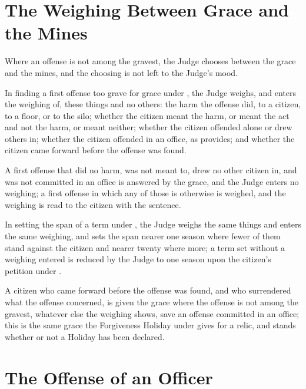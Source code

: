 \section{The Weighing Between Grace and the Mines}
\label{sec:crimes:weighing-between-grace-and-the-mines}

Where an offense is not among the gravest, the Judge chooses between the grace and the mines, and the choosing is not left to the Judge's mood.

\begin{clauses}
\item In finding a first offense too grave for grace under , the Judge weighs, and enters the weighing of, these things and no others: the harm the offense did, to a citizen, to a floor, or to the silo; whether the citizen meant the harm, or meant the act and not the harm, or meant neither; whether the citizen offended alone or drew others in; whether the citizen offended in an office, as  provides; and whether the citizen came forward before the offense was found.
\item A first offense that did no harm, was not meant to, drew no other citizen in, and was not committed in an office is answered by the grace, and the Judge enters no weighing; a first offense in which any of those is otherwise is weighed, and the weighing is read to the citizen with the sentence.
\item In setting the span of a term under , the Judge weighs the same things and enters the same weighing, and sets the span nearer one season where fewer of them stand against the citizen and nearer twenty where more; a term set without a weighing entered is reduced by the Judge to one season upon the citizen's petition under .
\item A citizen who came forward before the offense was found, and who surrendered what the offense concerned, is given the grace where the offense is not among the gravest, whatever else the weighing shows, save an offense committed in an office; this is the same grace the Forgiveness Holiday under  gives for a relic, and stands whether or not a Holiday has been declared.
\end{clauses}

\section{The Offense of an Officer}
\label{sec:crimes:offense-of-an-officer}

